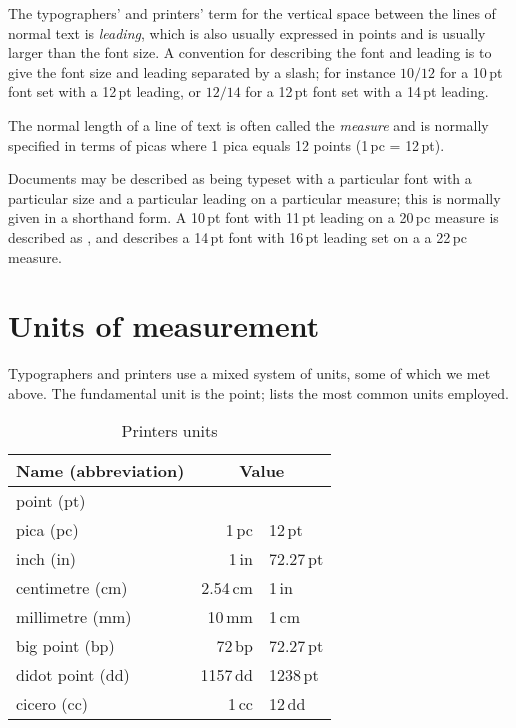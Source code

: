 \documentclass[10pt,a4paper,oneside,extrafontsizes]{memoir}%
\newcommand\U[2]{\textrm{#1}\,\textrm{#2}}
\begin{document}
\begin{paracol}{2}
\switchEng
    The typographers' and printers' term for the vertical space between
the lines of normal text is \emph{leading}, which is also
usually expressed in points and is usually larger than the font size.
A convention for describing the font and leading is to give the font size 
and leading separated by a slash; for instance $10/12$ for a
\U{10}{pt} font set with a \U{12}{pt} leading, or $12/14$ for a \U{12}{pt} font set with a
\U{14}{pt} leading.

    The normal length of a line of text is often called the 
\emph{measure} and is normally specified in terms of
picas where 1 pica equals 12 points (\U{1}{pc} = \U{12}{pt}).

    Documents may be described as being typeset with a particular font
with a particular size and a particular leading on a particular measure;
this is normally given in a shorthand form. 
A \U{10}{pt} font with \U{11}{pt} leading on a \U{20}{pc} measure is described as
, and  describes a \U{14}{pt} font
with \U{16}{pt} leading set on a a \U{22}{pc} measure.
\end{paracol}


\section{Units of measurement}

\begin{paracol}{2}
\switchEng
    Typographers and printers use a mixed system of units, some of which
we met above. The fundamental unit is the point;  lists 
the most common units employed.
\end{paracol}

\begin{table}
\centering
\caption{Printers units} \label{tab:units}
\begin{tabular}{l r @{\,=\,} l   } \toprule
  Name (abbreviation) & \multicolumn{2}{c}{Value}
  \\ 
  \midrule
  point (pt)\index{point}\index{pt}          &   \multicolumn{2}{c}{}         
  \\
  pica (pc)\index{pica}\index{pc}           & \U{1}{pc} & \U{12}{pt} 
  \\
  inch (in)\index{inch}\index{in}           & \U{1}{in} & 72.\U{27}{pt} 
  \\
  centimetre (cm)\index{centimetre}\index{cm}     & 2.\U{54}{cm} & \U{1}{in} 
  \\
  millimetre (mm)\index{millimetre}\index{mm}     & \U{10}{mm} & \U{1}{cm} 
  \\ 
  big point (bp)\index{big point}\index{bp}      & \U{72}{bp} & 72.\U{27}{pt} 
  \\
  didot point (dd)\index{didot point}\index{dd}    & \U{1157}{dd} & \U{1238}{pt} 
  \\
  cicero (cc)\index{cicero}\index{cc}         & \U{1}{cc} & \U{12}{dd} 
  \\
  \bottomrule
\end{tabular}
\end{table}
\end{document}
